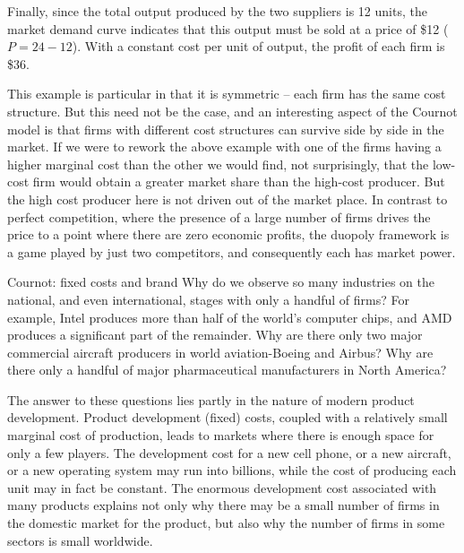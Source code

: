 Finally, since the total output produced by the two suppliers is 12 units, the market demand curve indicates that this output must be sold at a price of \$12 ($P=24-12$). With a constant cost per unit of output, the profit of each firm is \$36.

This example is particular in that it is symmetric -- each firm has the same cost structure. But this need not be the case, and an interesting aspect of the Cournot model is that firms with different cost structures can survive side by side in the market. If we were to rework the above example with one of the firms having a higher marginal cost than the other we would find, not surprisingly, that the low-cost firm would obtain a greater market share than the high-cost producer. But the high cost producer here is not driven out of the market place. In contrast to perfect competition, where the presence of a large number of firms drives the price to a point where there are zero economic profits, the duopoly framework is a game played by just two competitors, and consequently each has market power.

\begin{ApplicationBox}{Cournot: fixed costs and brand \label{app:cournot}}
Why do we observe so many industries on the national, and even international, stages with only a handful of firms? For example, Intel produces more than half of the world's computer chips, and AMD produces a significant part of the remainder. Why are there only two major commercial aircraft producers in world aviation-Boeing and Airbus? Why are there only a handful of major pharmaceutical manufacturers in North America?

\bigskip
The answer to these questions lies partly in the nature of modern product development. Product development (fixed) costs, coupled with a relatively small marginal cost of production, leads to markets where there is enough space for only a few players. The development cost for a new cell phone, or a new aircraft, or a new operating system may run into billions, while the cost of producing each unit may in fact be constant.  The enormous development cost associated with many products explains not only why there may be a small number of firms in the domestic market for the product, but also why the number of firms in some sectors is small worldwide.
\end{ApplicationBox}